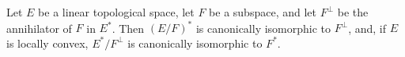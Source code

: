 Let $E$ be a linear topological space, let $F$ be a subspace, and let $F^{\perp}$ be the annihilator of $F$ in $E^{*}$. Then $(E/F)^{*}$ is canonically isomorphic to $F^{\perp}$, and, if $E$ is locally convex, $E^{*}/F^{\perp}$ is canonically isomorphic to $F^{*}$.
